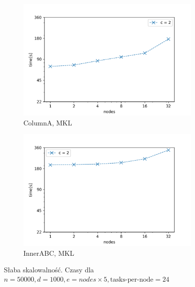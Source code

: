 \documentclass{article}
\begin{document}
\begin{figure}[ht!]
    \centering
    \begin{subfigure}[b]{0.45\textwidth}
        \includegraphics[width=\textwidth]{charts/s_50000_1000_weak_m}
        \caption{ColumnA, MKL}
    \end{subfigure}
    \begin{subfigure}[b]{0.45\textwidth}
        \includegraphics[width=\textwidth]{charts/s_50000_1000_weak_i_m}
        \caption{InnerABC, MKL}
    \end{subfigure}
    \caption{Słaba skalowalność. Czasy dla $n=50000, d=1000, e=nodes \times 5, \text{tasks-per-node}=24$}
    \label{fig:scal_weak}
\end{figure}
\end{document}
